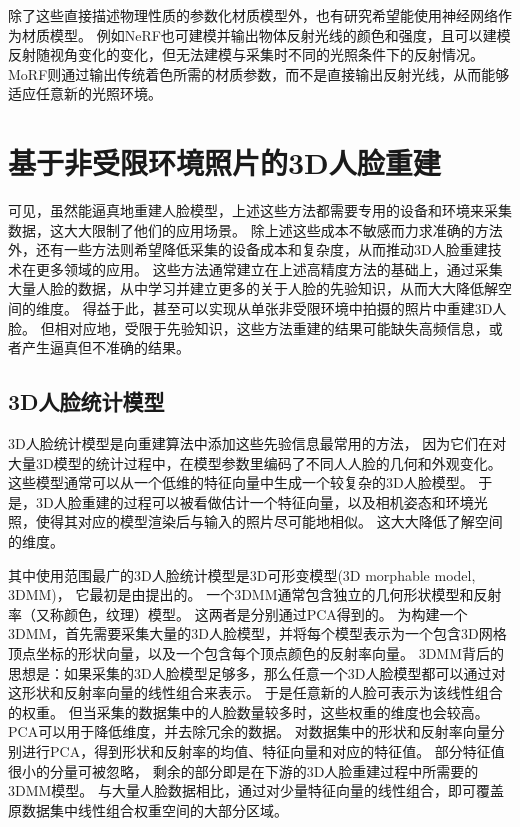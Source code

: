 除了这些直接描述物理性质的参数化材质模型外，也有研究希望能使用神经网络作为材质模型。
例如NeRF\citep{nerf}也可建模并输出物体反射光线的颜色和强度，且可以建模反射随视角变化的变化，但无法建模与采集时不同的光照条件下的反射情况。
MoRF\citep{MoRF}则通过输出传统着色所需的材质参数，而不是直接输出反射光线，从而能够适应任意新的光照环境。

\section{基于非受限环境照片的3D人脸重建}

可见，虽然能逼真地重建人脸模型，上述这些方法都需要专用的设备和环境来采集数据，这大大限制了他们的应用场景。
除上述这些成本不敏感而力求准确的方法外，还有一些方法则希望降低采集的设备成本和复杂度，从而推动3D人脸重建技术在更多领域的应用。
这些方法通常建立在上述高精度方法的基础上，通过采集大量人脸的数据，从中学习并建立更多的关于人脸的先验知识，从而大大降低解空间的维度。
得益于此，甚至可以实现从单张非受限环境中拍摄的照片中重建3D人脸\citep{danzhangtuxiangsanwei}。
但相对应地，受限于先验知识，这些方法重建的结果可能缺失高频信息，或者产生逼真但不准确的结果。

\subsection{3D人脸统计模型}

3D人脸统计模型是向重建算法中添加这些先验信息最常用的方法，
因为它们在对大量3D模型的统计过程中，在模型参数里编码了不同人人脸的几何和外观变化。
这些模型通常可以从一个低维的特征向量中生成一个较复杂的3D人脸模型。
于是，3D人脸重建的过程可以被看做估计一个特征向量，以及相机姿态和环境光照，使得其对应的模型渲染后与输入的照片尽可能地相似。
这大大降低了解空间的维度。

其中使用范围最广的3D人脸统计模型是3D可形变模型(3D morphable model, 3DMM)，
它最初是由\citet{3DMM}提出的。
一个3DMM通常包含独立的几何形状模型和反射率（又称颜色，纹理）模型。
这两者是分别通过PCA得到的。
为构建一个3DMM，首先需要采集大量的3D人脸模型，并将每个模型表示为一个包含3D网格顶点坐标的形状向量，以及一个包含每个顶点颜色的反射率向量。
3DMM背后的思想是：如果采集的3D人脸模型足够多，那么任意一个3D人脸模型都可以通过对这形状和反射率向量的线性组合来表示。
于是任意新的人脸可表示为该线性组合的权重。
但当采集的数据集中的人脸数量较多时，这些权重的维度也会较高。
PCA可以用于降低维度，并去除冗余的数据。
对数据集中的形状和反射率向量分别进行PCA，得到形状和反射率的均值、特征向量和对应的特征值。
部分特征值很小的分量可被忽略，
剩余的部分即是在下游的3D人脸重建过程中所需要的3DMM模型。
与大量人脸数据相比，通过对少量特征向量的线性组合，即可覆盖原数据集中线性组合权重空间的大部分区域。

